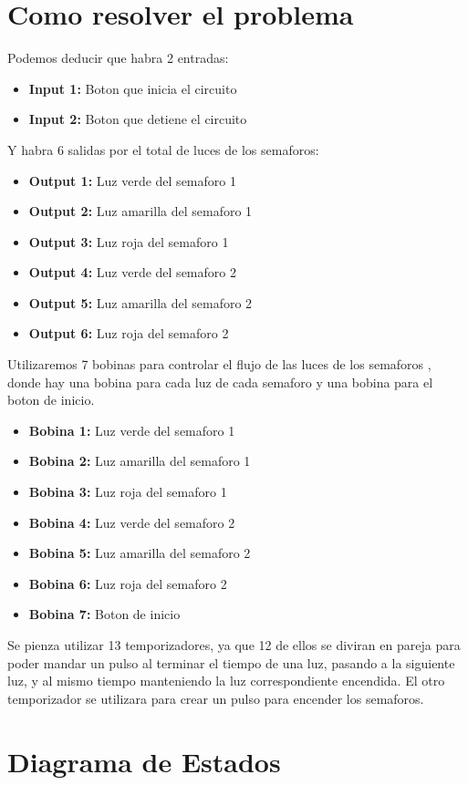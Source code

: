 \documentclass[12pt]{report}
\begin{document}
\section{Como resolver el problema}
  Podemos deducir que habra 2 entradas:
  \begin{itemize}
    \item \textbf{Input 1:} Boton que inicia el circuito
    \item \textbf{Input 2:} Boton que detiene el circuito
  \end{itemize}
  Y habra 6 salidas por el total de luces de los semaforos:
  \begin{itemize}
    \item \textbf{Output 1:} Luz verde del semaforo 1
    \item \textbf{Output 2:} Luz amarilla del semaforo 1
    \item \textbf{Output 3:} Luz roja del semaforo 1
    \item \textbf{Output 4:} Luz verde del semaforo 2
    \item \textbf{Output 5:} Luz amarilla del semaforo 2
    \item \textbf{Output 6:} Luz roja del semaforo 2
  \end{itemize}
  Utilizaremos 7 bobinas para controlar el flujo de las luces de los semaforos , donde hay una bobina para cada luz de cada semaforo y una bobina para el boton de inicio.
  \begin{itemize}
    \item \textbf{Bobina 1:} Luz verde del semaforo 1
    \item \textbf{Bobina 2:} Luz amarilla del semaforo 1
    \item \textbf{Bobina 3:} Luz roja del semaforo 1
    \item \textbf{Bobina 4:} Luz verde del semaforo 2
    \item \textbf{Bobina 5:} Luz amarilla del semaforo 2
    \item \textbf{Bobina 6:} Luz roja del semaforo 2
    \item \textbf{Bobina 7:} Boton de inicio
  \end{itemize}
  Se pienza utilizar 13 temporizadores, ya que 12 de ellos se diviran en pareja para poder mandar un pulso al terminar el tiempo de una luz, pasando a la siguiente luz, y al mismo tiempo manteniendo la luz correspondiente encendida.
  El otro temporizador se utilizara para crear un pulso para encender los semaforos.
\section{Diagrama de Estados}
\end{document}
